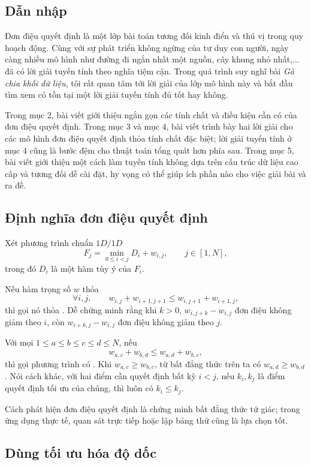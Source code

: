 \documentclass[11pt]{article}
\begin{document}
\subsection{Dẫn nhập}

Đơn điệu quyết định là một lớp bài toán tương đối kinh điển và thú vị trong
quy hoạch động. Cùng với sự phát triển không ngừng của tư duy con người, ngày
càng nhiều mô hình như đường đi ngắn nhất một nguồn, cây khung nhỏ nhất,... đã
có lời giải tuyến tính theo nghĩa tiệm cận. Trong quá trình suy nghĩ bài
\emph{Gà chia khối dữ liệu}, tôi rất quan tâm tới lời giải của lớp mô hình
này và bắt đầu tìm xem có tồn tại một lời giải tuyến tính đủ tốt hay không.

Trong mục 2, bài viết giới thiệu ngắn gọn các tính chất và điều kiện cần có
của đơn điệu quyết định. Trong mục 3 và mục 4, bài viết trình bày hai lời giải
cho các mô hình đơn điệu quyết định thỏa tính chất đặc biệt; lời giải tuyến
tính ở mục 4 cũng là bước đệm cho thuật toán tổng quát hơn phía sau. Trong
mục 5, bài viết giới thiệu một cách làm tuyến tính không dựa trên cấu trúc dữ
liệu cao cấp và tương đối dễ cài đặt, hy vọng có thể giúp ích phần nào cho
việc giải bài và ra đề.

\subsection{Định nghĩa đơn điệu quyết định}

Xét phương trình chuẩn \(1D/1D\)
\[
  F_j=\min_{0\le i<j} D_i+w_{i,j},\qquad j\in[1,N],
\]
trong đó \(D_i\) là một hàm tùy ý của \(F_i\).

Nếu hàm trọng số \(w\) thỏa
\[
  \forall i,j,\qquad
  w_{i,j}+w_{i+1,j+1}\le w_{i,j+1}+w_{i+1,j},
\]
thì gọi nó thỏa . Dễ chứng minh rằng khi
\(k>0\), \(w_{i,j+k}-w_{i,j}\) đơn điệu không giảm theo \(i\), còn
\(w_{i+k,j}-w_{i,j}\) đơn điệu không giảm theo \(j\).

Với mọi \(1\le a\le b\le c\le d\le N\), nếu
\[
  w_{a,c}+w_{b,d}\le w_{a,d}+w_{b,c},
\]
thì gọi phương trình có . Khi \(w_{a,c}\ge w_{b,c}\),
từ bất đẳng thức trên ta có \(w_{a,d}\ge w_{b,d}\). Nói cách khác, với hai
điểm cần quyết định bất kỳ \(i<j\), nếu \(k_i,k_j\) là điểm quyết định tối ưu
của chúng, thì luôn có \(k_i\le k_j\).

Cách phát hiện đơn điệu quyết định là chứng minh bất đẳng thức tứ giác; trong
ứng dụng thực tế, quan sát trực tiếp hoặc lập bảng thử cũng là lựa chọn tốt.

\subsection{Dùng tối ưu hóa độ dốc}
\end{document}
